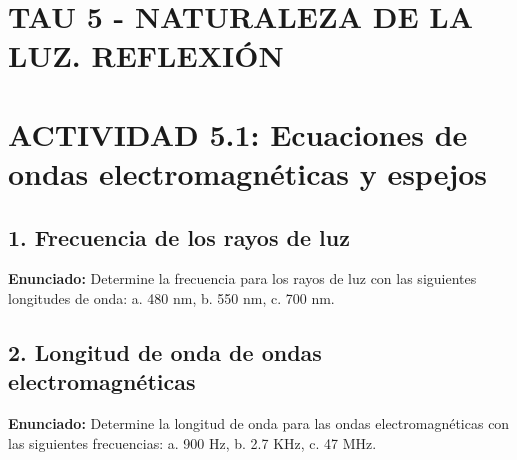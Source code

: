 \documentclass[12pt, letterpaper]{article}
\begin{document}
\newpage
\section*{TAU 5 - NATURALEZA DE LA LUZ. REFLEXIÓN}

\section*{ACTIVIDAD 5.1: Ecuaciones de ondas electromagnéticas y espejos}

\subsection*{1. Frecuencia de los rayos de luz}
\noindent \textbf{Enunciado:} Determine la frecuencia para los rayos de luz con las siguientes longitudes de onda: a. 480 nm, b. 550 nm, c. 700 nm.


\subsection*{2. Longitud de onda de ondas electromagnéticas}
\noindent \textbf{Enunciado:} Determine la longitud de onda para las ondas electromagnéticas con las siguientes frecuencias: a. 900 Hz, b. 2.7 KHz, c. 47 MHz.

\end{document}
